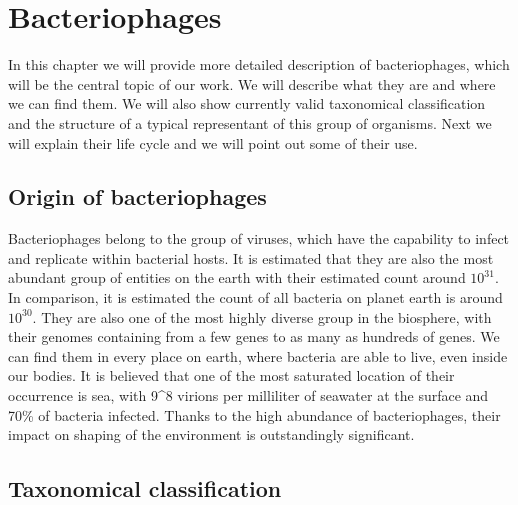\chapter{Bacteriophages}
In this chapter we will provide more detailed description of bacteriophages, which will be the central topic of our work.
We will describe what they are and where we can find them.
We will also show currently valid taxonomical classification and the structure of a typical representant of this group of organisms.
Next we will explain their life cycle and we will point out some of their use.

\section{Origin of bacteriophages}
Bacteriophages belong to the group of viruses, which have the capability to infect and replicate within bacterial hosts.
It is estimated that they are also the most abundant group of entities on the earth with their estimated count around $10^{31}$.
In comparison, it is estimated the count of all bacteria on planet earth is around $10^{30}$.
They are also one of the most highly diverse group in the biosphere, with their genomes containing from a few genes to as many as hundreds of genes.
We can find them in every place on earth, where bacteria are able to live, even inside our bodies.
It is believed that one of the most saturated location of their occurrence is sea, with  9^8 virions per milliliter of seawater at the surface and 70\% of bacteria infected. %
Thanks to the high abundance of bacteriophages, their impact on shaping of the environment is outstandingly significant.

\section{Taxonomical classification}

